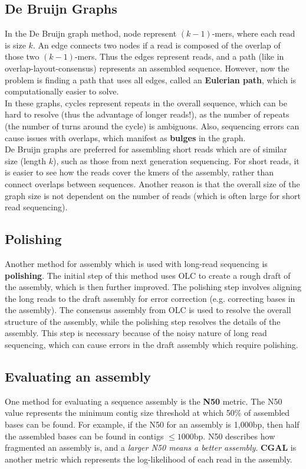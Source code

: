 \documentclass[12pt]{article}
\begin{document}
\subsection{De Bruijn Graphs}
In the De Bruijn graph method, node represent $(k-1)$-mers, where each read is size $k$. An edge connects two nodes if a read is composed of the overlap of those two $(k-1)$-mers. Thus the edges represent reads, and a path (like in overlap-layout-consensus) represents an assembled sequence. However, now the problem is finding a path that uses all edges, called an \textbf{Eulerian path}, which is computationally easier to solve.\\[10pt]
In these graphs, cycles represent repeats in the overall sequence, which can be hard to resolve (thus the advantage of longer reads!), as the number of repeats (the number of turns around the cycle) is ambiguous. Also, sequencing errors can cause issues with overlaps, which manifest as \textbf{bulges} in the graph.\\[10pt]
De Bruijn graphs are preferred for assembling short reads which are of similar size (length $k$), such as those from next generation sequencing. For short reads, it is easier to see how the reads cover the kmers of the assembly, rather than connect overlaps between sequences. Another reason is that the overall size of the graph size is not dependent on the number of reads (which is often large for short read sequencing). 

\subsection{Polishing}
Another method for assembly which is used with long-read sequencing is \textbf{polishing}. The initial step of this method uses OLC to create a rough draft of the assembly, which is then further improved. The polishing step involves aligning the long reads to the draft assembly for error correction (e.g. correcting bases in the assembly). The consensus assembly from OLC is used to resolve the overall structure of the assembly, while the polishing step resolves the details of the assembly. This step is necessary because of the noisy nature of long read sequencing, which can cause errors in the draft assembly which require polishing.

\subsection{Evaluating an assembly}
One method for evaluating a sequence assembly is the \textbf{N50} metric. The N50 value represents the minimum contig size threshold at which 50\% of assembled bases can be found. For example, if the N50 for an assembly is 1,000bp, then half the assembled bases can be found in contigs $\leq 1000$bp. N50 describes how fragmented an assembly is, and a \textit{larger N50 means a better assembly}. \textbf{CGAL} is another metric which represents the log-likelihood of each read in the assembly.
\end{document}
